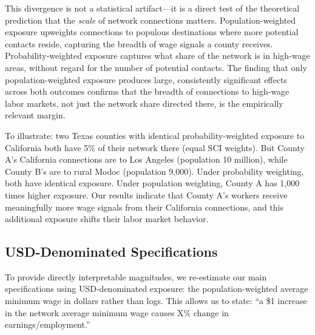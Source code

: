 \documentclass[12pt]{article}
\begin{document}
This divergence is not a statistical artifact---it is a direct test of the theoretical prediction that the \textit{scale} of network connections matters. Population-weighted exposure upweights connections to populous destinations where more potential contacts reside, capturing the breadth of wage signals a county receives. Probability-weighted exposure captures what share of the network is in high-wage areas, without regard for the number of potential contacts. The finding that only population-weighted exposure produces large, consistently significant effects across both outcomes confirms that the breadth of connections to high-wage labor markets, not just the network share directed there, is the empirically relevant margin.

To illustrate: two Texas counties with identical probability-weighted exposure to California both have 5\% of their network there (equal SCI weights). But County A's California connections are to Los Angeles (population 10 million), while County B's are to rural Modoc (population 9,000). Under probability weighting, both have identical exposure. Under population weighting, County A has 1,000 times higher exposure. Our results indicate that County A's workers receive meaningfully more wage signals from their California connections, and this additional exposure shifts their labor market behavior.

\subsection{USD-Denominated Specifications}

To provide directly interpretable magnitudes, we re-estimate our main specifications using USD-denominated exposure: the population-weighted average minimum wage in dollars rather than logs. This allows us to state: ``a \$1 increase in the network average minimum wage causes X\% change in earnings/employment.''
\end{document}
